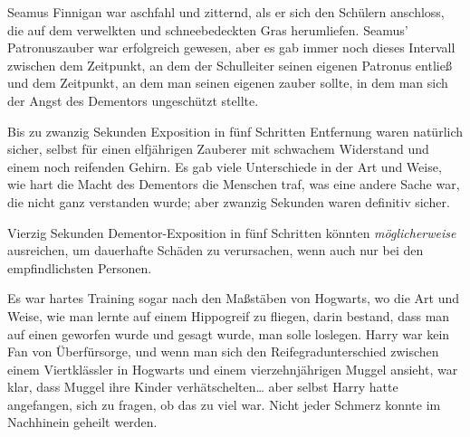 \later

Seamus Finnigan war aschfahl und zitternd, als er sich den Schülern anschloss, die auf dem verwelkten und schneebedeckten Gras herumliefen. Seamus' Patronuszauber war erfolgreich gewesen, aber es gab immer noch dieses Intervall zwischen dem Zeitpunkt, an dem der Schulleiter seinen eigenen Patronus entließ und dem Zeitpunkt, an dem man seinen eigenen zauber sollte, in dem man sich der Angst des Dementors ungeschützt stellte.

Bis zu zwanzig Sekunden Exposition in fünf Schritten Entfernung waren natürlich sicher, selbst für einen elfjährigen Zauberer mit schwachem Widerstand und einem noch reifenden Gehirn. Es gab viele Unterschiede in der Art und Weise, wie hart die Macht des Dementors die Menschen traf, was eine andere Sache war, die nicht ganz verstanden wurde; aber zwanzig Sekunden waren definitiv sicher.

Vierzig Sekunden Dementor-Exposition in fünf Schritten könnten \emph{möglicherweise} ausreichen, um dauerhafte Schäden zu verursachen, wenn auch nur bei den empfindlichsten Personen.

Es war hartes Training sogar nach den Maßstäben von Hogwarts, wo die Art und Weise, wie man lernte auf einem Hippogreif zu fliegen, darin bestand, dass man auf einen geworfen wurde und gesagt wurde, man solle loslegen. Harry war kein Fan von Überfürsorge, und wenn man sich den Reifegradunterschied zwischen einem Viertklässler in Hogwarts und einem vierzehnjährigen Muggel ansieht, war klar, dass Muggel ihre Kinder verhätschelten… aber selbst Harry hatte angefangen, sich zu fragen, ob das zu viel war. Nicht jeder Schmerz konnte im Nachhinein geheilt werden.

